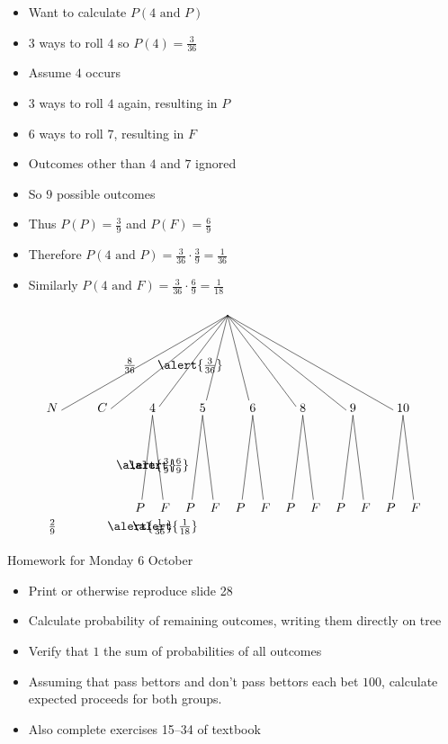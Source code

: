 \documentclass[handout]{beamer}
\theoremstyle{definition}
\begin{document}
\begin{frame}
\begin{itemize}
\item Want to calculate $P\left(\text{$4$ and $P$}\right)$
\item $3$ ways to roll $4$ so $P\left(4\right)=\frac{3}{36}$
\item Assume $4$ occurs
\item $3$ ways to roll $4$ again, resulting in $P$
\item $6$ ways to roll $7$, resulting in $F$
\item Outcomes other than $4$ and $7$ ignored
\item So $9$ possible outcomes
\item Thus $P\left(P\right)=\frac{3}{9}$
and $P\left(F\right)=\frac{6}{9}$
\item Therefore
$P\left(\text{$4$ and $P$}\right)
=\frac{3}{36}\cdot\frac{3}{9}=\frac{1}{36}$
\item Similarly $P\left(\text{$4$ and $F$}\right)
=\frac{3}{36}\cdot\frac{6}{9}=\frac{1}{18}$
\end{itemize}
\end{frame}

\begin{frame}
\[\begin{xy}<1.4cm,0cm>:
(4.5,0)="0";
(1,-2)="N";(2,-2)="C";(3,-2)="4";(4,-2)="5";
(5,-2)="6";(6,-2)="8";(7,-2)="9";(8,-2)="10";
"0";"N"*+!D{N}**\dir{-}?*+!R{\frac{8}{36}};
"0";"C"*+!D{C}**\dir{-};
"0";"4"*+!D{4}**\dir{-}?*{\alert{\frac{3}{36}}};
"0";"5"*+!D{5}**\dir{-};
"0";"6"*+!D{6}**\dir{-};
"0";"8"*+!D{8}**\dir{-};
"0";"9"*+!D{9}**\dir{-};
"0";"10"*+!D{10}**\dir{-};
"4";(2.75,-4)*+!D{P}**\dir{-}?*{\alert{\frac{3}{9}}};
"4";(3.25,-4)*+!D{F}**\dir{-}?*{\alert{\frac{6}{9}}};
"5";(3.75,-4)*+!D{P}**\dir{-};
"5";(4.25,-4)*+!D{F}**\dir{-};
"6";(4.75,-4)*+!D{P}**\dir{-};
"6";(5.25,-4)*+!D{F}**\dir{-};
"8";(5.75,-4)*+!D{P}**\dir{-};
"8";(6.25,-4)*+!D{F}**\dir{-};
"9";(6.75,-4)*+!D{P}**\dir{-};
"9";(7.25,-4)*+!D{F}**\dir{-};
"10";(7.75,-4)*+!D{P}**\dir{-};
"10";(8.25,-4)*+!D{F}**\dir{-};
(1,-4)*+!U{\frac{2}{9}};
(2.75,-4)*+!U{\alert{\frac{1}{36}}};
(3.25,-4)*+!U{\alert{\frac{1}{18}}};
\end{xy}\]
\end{frame}

\begin{frame}{Homework for Monday 6 October}
\begin{itemize}
\item Print or otherwise reproduce slide 28
\item Calculate probability of remaining outcomes,
writing them directly on tree
\item Verify that $1$ the sum of probabilities
of all outcomes
\item Assuming that pass bettors and
don't pass bettors each bet $100$,
calculate expected proceeds for both groups.
\item Also complete exercises 15--34 of textbook
\end{itemize}
\end{frame}
\end{document}
